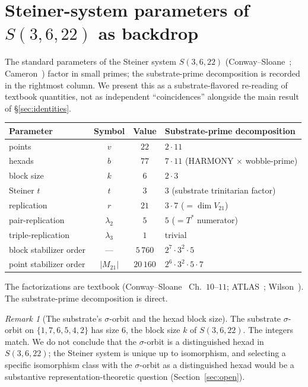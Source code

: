 \documentclass[11pt,reqno]{amsart}
\theoremstyle{plain}
\theoremstyle{definition}
\theoremstyle{remark}
\newtheorem*{remark}{Remark}
\newcommand{\sig}{\sigma}
\begin{document}
\section{Steiner-system parameters of $S(3, 6, 22)$ as backdrop}
\label{sec:steiner-table}

The standard parameters of the Steiner system $S(3, 6, 22)$
(Conway--Sloane~\cite{ConwaySloane1999};
Cameron~\cite{Cameron1999}) factor in small primes; the
substrate-prime decomposition is recorded in the rightmost column.
We present this as a substrate-flavored re-reading of textbook
quantities, not as independent ``coincidences'' alongside the main
result of \S\ref{sec:identities}.

\begin{center}
\begin{tabular}{l c c l}
\toprule
Parameter & Symbol & Value & Substrate-prime decomposition \\
\midrule
points     & $v$         & $22$  & $2 \cdot 11$ \\
hexads     & $b$         & $77$  & $7 \cdot 11$ (HARMONY $\times$ wobble-prime) \\
block size & $k$         & $6$   & $2 \cdot 3$ \\
Steiner $t$ & $t$        & $3$   & $3$ (substrate trinitarian factor) \\
replication & $r$        & $21$  & $3 \cdot 7$ ($= \dim V_{21}$) \\
pair-replication & $\lambda_{2}$ & $5$ & $5$ ($= T^{*}$ numerator) \\
triple-replication & $\lambda_{3}$ & $1$ & trivial \\
block stabilizer order & --- & $5\,760$ & $2^{7} \cdot 3^{2} \cdot 5$ \\
point stabilizer order & $|M_{21}|$ & $20\,160$ & $2^{6} \cdot 3^{2} \cdot 5 \cdot 7$ \\
\bottomrule
\end{tabular}
\end{center}

The factorizations are textbook (Conway--Sloane~\cite{ConwaySloane1999}
Ch.~$10$--$11$; ATLAS~\cite{ATLAS1985}; Wilson~\cite{Wilson2009}). The
substrate-prime decomposition is direct.

\begin{remark}[The substrate's $\sig$-orbit and the hexad block size]
The substrate $\sig$-orbit on $\{1, 7, 6, 5, 4, 2\}$ has size $6$,
the block size $k$ of $S(3, 6, 22)$. The integers match. We do not
conclude that the $\sig$-orbit is a distinguished hexad in
$S(3, 6, 22)$; the Steiner system is unique up to isomorphism, and
selecting a specific isomorphism class with the $\sig$-orbit as a
distinguished hexad would be a substantive representation-theoretic
question (Section~\ref{sec:open}).
\end{remark}
\end{document}
